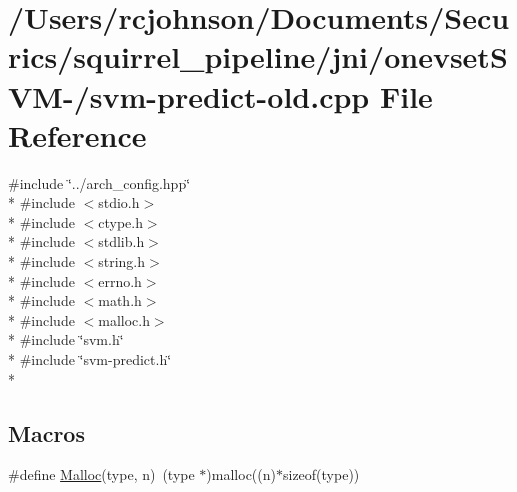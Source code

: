 \hypertarget{svm-predict-old_8cpp}{\section{/\-Users/rcjohnson/\-Documents/\-Securics/squirrel\-\_\-pipeline/jni/onevset\-S\-V\-M-\//svm-\/predict-\/old.cpp File Reference}
\label{svm-predict-old_8cpp}
}
{\ttfamily \#include \char`\"{}../arch\-\_\-config.\-hpp\char`\"{}}\\*
{\ttfamily \#include $<$stdio.\-h$>$}\\*
{\ttfamily \#include $<$ctype.\-h$>$}\\*
{\ttfamily \#include $<$stdlib.\-h$>$}\\*
{\ttfamily \#include $<$string.\-h$>$}\\*
{\ttfamily \#include $<$errno.\-h$>$}\\*
{\ttfamily \#include $<$math.\-h$>$}\\*
{\ttfamily \#include $<$malloc.\-h$>$}\\*
{\ttfamily \#include \char`\"{}svm.\-h\char`\"{}}\\*
{\ttfamily \#include \char`\"{}svm-\/predict.\-h\char`\"{}}\\*
\subsection*{Macros}
\begin{DoxyCompactItemize}
\item 
\#define \hyperlink{svm-predict-old_8cpp_a9191047fd644a5f519152ecb4aa60357}{Malloc}(type, n)~(type $\ast$)malloc((n)$\ast$sizeof(type))
\end{DoxyCompactItemize}
